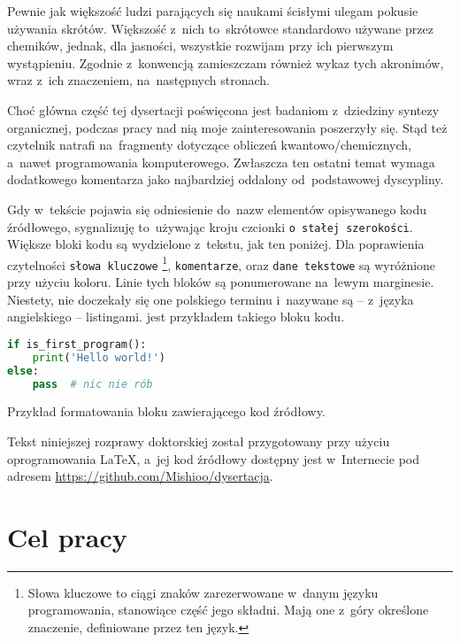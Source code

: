 Pewnie jak większość ludzi parających się naukami ścisłymi ulegam pokusie używania skrótów.
Większość z~nich to~skrótowce standardowo używane przez chemików,
  jednak, dla jasności, wszystkie rozwijam przy ich pierwszym wystąpieniu.
Zgodnie z~konwencją zamieszczam również wykaz tych akronimów,
  wraz z~ich znaczeniem, na~następnych stronach.

Choć główna część tej dysertacji poświęcona jest badaniom z~dziedziny syntezy organicznej,
  podczas pracy nad nią moje zainteresowania poszerzyły się.
Stąd też czytelnik natrafi na~fragmenty dotyczące obliczeń kwantowo\-/chemicznych,
  a~nawet programowania komputerowego.
Zwłaszcza ten ostatni temat wymaga dodatkowego komentarza jako najbardziej oddalony
  od~podstawowej dyscypliny.

Gdy w~tekście pojawia się odniesienie do~nazw elementów opisywanego kodu źródłowego,
  sygnalizuję to~używając kroju czcionki \lstinline!o stałej szerokości!.
Większe bloki kodu są wydzielone z~tekstu, jak ten poniżej.
Dla poprawienia czytelności 
  \lstinline[basicstyle=\ttfamily\color{wongvermillion},columns=fixed]!słowa kluczowe!%
  \footnote{
    Słowa kluczowe to ciągi znaków zarezerwowane w~danym języku programowania,
      stanowiące część jego składni.
    Mają one z~góry określone znaczenie, definiowane przez ten język.
  },
  \lstinline[basicstyle=\ttfamily\color{wongsky},columns=fixed]!komentarze!, oraz 
  \lstinline[basicstyle=\ttfamily\color{wonggreen},columns=fixed]!dane tekstowe!
  są wyróżnione przy użyciu koloru.
Linie tych bloków są ponumerowane na~lewym marginesie.
Niestety, nie doczekały się one polskiego terminu i~nazywane są \--- 
  z~języka angielskiego \--- listingami.
 jest przykładem takiego bloku kodu.

\begin{listing}
\begin{lstlisting}[language=Python]
if is_first_program():
    print('Hello world!')
else:
    pass  # nic nie rób
\end{lstlisting}
\caption{Przykład formatowania bloku zawierającego kod źródłowy.}
\label{lst:example}
\end{listing}

Tekst niniejszej rozprawy doktorskiej został przygotowany przy użyciu oprogramowania \LaTeX,
  a~jej kod źródłowy dostępny jest w~Internecie pod adresem
  \url{https://github.com/Mishioo/dysertacja}.

\section{Cel pracy}\label{intro:goal}

